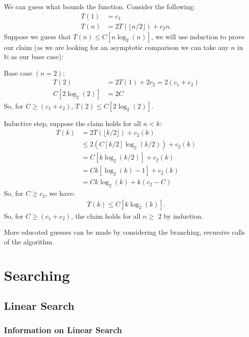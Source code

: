 \documentclass[a4paper, 12pt, twoside]{article}
\begin{document}
We can guess what bounds the function. Consider the following:
\begin{align*}
      T(1) &= c_1 \\
      T(n) &= 2T(\lfloor n / 2 \rfloor) + c_2n.
\end{align*}
Suppose we guess that $T(n) \leq C[n\log_2(n)]$, we will use induction
to prove our claim (as we are looking for an asymptotic comparison
we can take any $n$ in $\mathbb{N}$ as our base case):
\begin{center}
      Base case $(n = 2)$:
      \begin{align*}
            T(2) & = 2T(1) + 2c_2 = 2(c_1 + c_2) \\
            C[2\log_2(2)] & = 2C
      \end{align*} 
      So, for $C \geq (c_1 + c_2)$, $T(2) \leq C[2\log_2(2)]$.    
\end{center}
\begin{center}
      Inductive step, suppose the claim holds for all $n < k$:
      \begin{align*}
            T(k) & = 2T(\lfloor k / 2 \rfloor) + c_2(k) \\
            & \leq 2(C[k / 2]\log_2(k / 2)) + c_2(k) \\
            & = C[k\log_2(k / 2)] + c_2(k) \\
            & = Ck[\log_2(k) - 1] + c_2(k) \\
            & = Ck\log_2(k) + k(c_2 - C)
      \end{align*}
      So, for $C \geq c_2$, we have:
      \begin{align*}
            T(k) \leq C[k\log_2(k)].
      \end{align*}
      So, for $C \geq (c_1 + c_2)$, the claim holds for all $n \geq$ 2
      by induction.
\end{center}
More educated guesses can be made by considering the branching,
recursive calls of the algorithm.

\section{Searching}

\subsection{Linear Search}

\subsubsection{Information on Linear Search}
\end{document}
